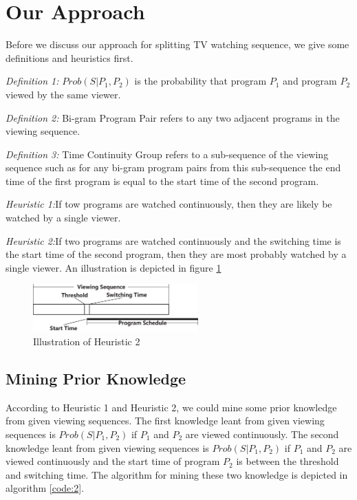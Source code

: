 \section{Our Approach}

Before we discuss our approach for splitting TV watching sequence, we give some definitions and heuristics first.

\emph{Definition 1:} $Prob(S|P_1,P_2)$ is the probability that program $P_1$ and program $P_2$ viewed by the same viewer.

\emph{Definition 2:} Bi-gram Program Pair refers to any two adjacent programs in the viewing sequence.

\emph{Definition 3:} Time Continuity Group refers to a sub-sequence of the viewing sequence such as for any bi-gram program pairs from this sub-sequence the end time of the first program is equal to the start time of the second program.

\emph{Heuristic 1:}If tow programs are watched continuously, then they are likely be watched by a single viewer.

\emph{Heuristic 2:}If two programs are watched continuously and the switching time is the start time of the second
 program, then they are most probably watched by a single viewer. An illustration is depicted in figure \ref{fig:2}

\begin{figure}[htbp]
\centering
\includegraphics[width=2.5in]{h2.eps}
\caption{Illustration of Heuristic 2}
\label{fig:2}
\end{figure}

\subsection{Mining Prior Knowledge}
According to Heuristic 1 and Heuristic 2, we could mine some prior knowledge from given viewing sequences.
The first knowledge leant from given viewing sequences is $Prob(S|P_1,P_2)$ if $P_1$ and $P_2$ are viewed continuously.
The second knowledge leant from given viewing sequences is $Prob(S|P_1,P_2)$ if $P_1$ and $P_2$ are viewed continuously and
the start time of program $P_2$ is between the threshold and switching time. The algorithm for mining these two knowledge is
depicted in algorithm \ref{code:2}.

